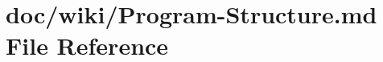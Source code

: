 \hypertarget{_program-_structure_8md}{}\section{doc/wiki/\+Program-\/\+Structure.md File Reference}
\label{_program-_structure_8md}
